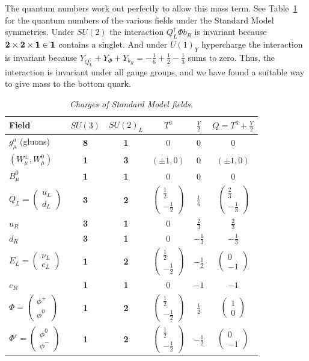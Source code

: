 \documentclass[12pt]{article}
\def\vector#1#2{\left( \begin{array}{c}#1\\ #2\end{array}\right)}
\begin{document}
The quantum numbers work out perfectly to allow this mass term. See Table~\ref{table:charges} for the quantum numbers of the various fields under the Standard Model symmetries. Under $SU(2)$ the interaction $Q_L^\dagger \Phi b_R$ is  invariant because ${\bf 2}\times {\bf 2}\times {\bf 1}\in {\bf 1}$ contains a singlet. And under $U(1)_Y$ hypercharge the interaction is invariant because $Y_{Q^\dagger_L}+Y_\Phi+Y_{b_R}=-\frac{1}{6}+\frac{1}{2}-\frac{1}{3}$ sums to zero.  Thus, the interaction is invariant under all gauge groups, and we have found a suitable way to give mass to the bottom quark.

\begin{table}
\begin{center}
\begin{tabular}{lccccc}
\hline\hline
Field & $SU(3)$ & $SU(2)_L$ & $T^3$ & $\frac{Y}{2}$ & $Q=T^3+\frac{Y}{2}$ \\
\hline
$g_\mu^a$ (gluons) & {\bf 8} & {\bf 1} & 0 & 0 & 0 \\
$(W_\mu^\pm, W_\mu^0)$ & {\bf 1} & {\bf 3} & $(\pm 1,0)$ &  0 &   $(\pm 1,0)$ \\
$B^0_\mu$  & {\bf 1} & {\bf 1} &  0 & 0 & 0 \\
\hline
$Q_L=\vector{u_L}{d_L}$ & {\bf 3} & {\bf 2} & $\vector{\frac{1}{2}}{-\frac{1}{2}}$ & $\frac{1}{6}$ & $\vector{\frac{2}{3}}{-\frac{1}{3}}$ \\
$u_R$ & {\bf 3} & {\bf 1} & 0 & $\frac{2}{3}$ & $\frac{2}{3}$ \\
$d_R$ & {\bf 3} & {\bf 1}& 0 & $-\frac{1}{3}$ & $-\frac{1}{3}$ \\
$E_L=\vector{\nu_L}{e_L}$ & {\bf 1} & {\bf 2}& $\vector{\frac{1}{2}}{-\frac{1}{2}}$ & $-\frac{1}{2}$ & $\vector{0}{-1}$ \\
$e_R$ & {\bf 1} & {\bf 1}& 0 & $-1$ & $-1$ \\ 
\hline
$\Phi=\vector{\phi^+}{\phi^0}$  & {\bf 1} & {\bf 2} & $\vector{\frac{1}{2}}{-\frac{1}{2}}$ &  $\frac{1}{2}$ & $\vector{1}{0}$ \\
$\Phi^c=\vector{\phi^0}{\phi^-}$  & {\bf 1} & {\bf 2}& $\vector{\frac{1}{2}}{-\frac{1}{2}}$ & $-\frac{1}{2}$ & $\vector{0}{-1}$ \\
\hline
\hline
\end{tabular}
\end{center}
\caption{\em Charges of Standard Model fields. \label{table:charges}}
\end{table}
\end{document}

